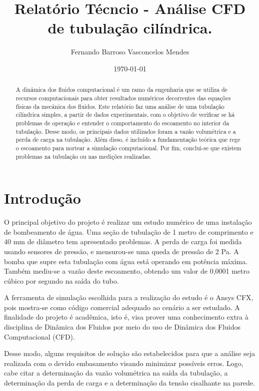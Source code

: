 \documentclass[12pt]{article}
\begin{document}
\title{Relatório Técncio - Análise CFD de tubulação cilíndrica.}
\author{Fernando Barroso Vasconcelos Mendes}
\date{\today}
\maketitle

\begin{abstract}
A dinâmica dos fluidos computacional é um ramo da engenharia que se utiliza de recursos computacionais para obter resultados numéricos decorrentes das equações físicas da mecânica dos fluidos. Este relatório faz uma análise de uma tubulação cilíndrica simples, a partir de dados experimentais, com o objetivo de verificar se há problemas de operação e entender o comportamento do escoamento no interior da tubulação. Desse modo, os principais dados utilizados foram a vazão volumétrica e a perda de carga na tubulação. Além disso, é incluído a fundamentação teórica que rege o escoamento para nortear a simulação computacional. Por fim, conclui-se que existem problemas na tubulação ou nas medições realizadas.
\end{abstract}


\section{Introdução}


O principal objetivo do projeto é realizar um estudo numérico de uma instalação de bombeamento de água. Uma seção de tubulação de 1 metro de comprimento e 40 mm de diâmetro tem apresentado problemas. A perda de carga foi medida usando sensores de pressão, e mensurou-se uma queda de pressão de 2 Pa. A bomba que supre esta tubulação com água está operando em potência máxima. Também mediu-se a vazão deste escoamento, obtendo um valor de 0,0001 metro cúbico por segundo na saída do tubo.

A ferramenta de simulação escolhida para a realização do estudo é o Ansys CFX, pois mostra-se como código comercial adequado ao cenário a ser estudado. A finalidade do projeto é acadêmica, isto é, visa prover uma conhecimento extra à disciplina de Dinâmica dos Fluidos por meio do uso de Dinâmica dos Fluidos Computacional (CFD).

Desse modo, alguns requisitos de solução são estabelecidos para que a análise seja realizada com o devido embasamento visando minimizar possíveis erros. Logo, cabe citar a determinação da vazão volumétrica na saída da tubulação, a determinação da perda de carga e a determinação da tensão cisalhante na parede.
\end{document}
